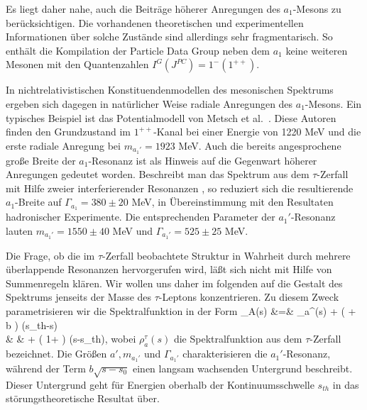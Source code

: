Es liegt daher nahe, auch die Beitr\"age h\"oherer Anregungen des 
$a_1$-Mesons zu ber\"ucksichtigen. Die vorhandenen theoretischen 
und experimentellen Informationen \"uber solche Zust\"ande sind 
allerdings sehr fragmentarisch. So enth\"alt die Kompilation der
Particle Data Group \cite{PDG90} neben dem $a_1$ keine weiteren 
Mesonen mit den Quantenzahlen $I^G(J^{PC})=1^-(1^{++})$.

In nichtrelativistischen Konstituendenmodellen des mesonischen 
Spektrums ergeben sich dagegen in nat\"urlicher Weise radiale
Anregungen des $a_1$-Mesons. Ein typisches Beispiel ist das
Potentialmodell von Metsch et al.~\cite{Met90}. Diese Autoren 
finden den Grundzustand im $1^{++}$-Kanal bei einer Energie
von 1220 MeV und die erste radiale Anregung bei $m_{a_1'}=
1923$ MeV. Auch die bereits angesprochene gro\ss e Breite der
$a_1$-Resonanz ist als Hinweis auf die Gegenwart h\"oherer Anregungen
gedeutet worden. Beschreibt man das Spektrum aus dem $\tau$-Zerfall
mit Hilfe zweier interferierender Resonanzen \cite{IKM89},
so reduziert sich die resultierende $a_1$-Breite auf 
$\Gamma_{a_1}=380\pm 20$ MeV, in \"Ubereinstimmung mit den
Resultaten hadronischer Experimente.  Die entsprechenden 
Parameter der $a_1'$-Resonanz lauten $m_{a_1'}=1550\pm 40$ MeV
und $\Gamma_{a_1'}=525\pm 25$ MeV.

Die Frage, ob die im $\tau$-Zerfall beobachtete Struktur in 
Wahrheit durch mehrere \"uberlappende Resonanzen hervorgerufen
wird, l\"a\ss t sich  nicht mit Hilfe von Summenregeln    
kl\"aren. Wir wollen uns daher im folgenden auf die Gestalt des 
Spektrums jenseits der Masse des $\tau$-Leptons konzentrieren. 
Zu diesem Zweck parametrisieren wir die Spektralfunktion 
in der Form
\beq
\label{rhoap}
  \rho_A(s) &=& \rho_a^\tau (s) + \Big( 
    + b \Big)
   \Theta (s_{th}-s)   \\[0.1cm]
   & &  \hspace{1.3cm} \mbox{}+ 
   \Big( 1+ \Big) \Theta (s-s_{th}), \nonumber
\eeq
wobei $\rho_a^\tau (s)$ die Spektralfunktion aus dem $\tau$-Zerfall 
bezeichnet. Die Gr\"o\ss en $a',m_{a_1'}$ und $\Gamma_{a_1'}$ 
charakterisieren die $a_1'$-Resonanz, w\"ahrend der Term 
$b\sqrt{s-s_0}$ einen langsam wachsenden Untergrund beschreibt. 
Dieser Untergrund geht f\"ur Energien oberhalb der 
Kontinuumsschwelle $s_{th}$ in das st\"orungstheoretische Resultat 
\"uber.

